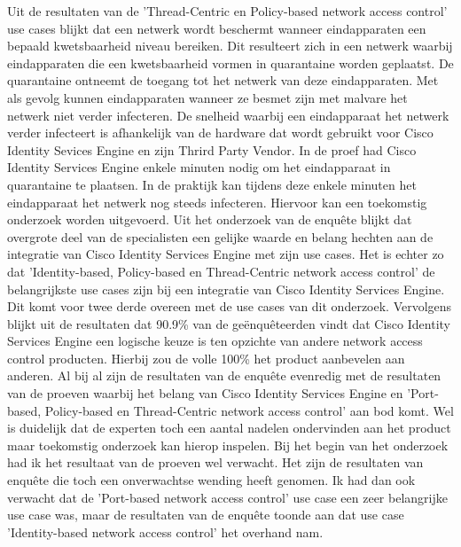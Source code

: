 Uit de resultaten van de 'Thread-Centric en Policy-based network access control' use cases blijkt dat een netwerk wordt beschermt wanneer eindapparaten een bepaald kwetsbaarheid niveau bereiken. Dit resulteert zich in een netwerk waarbij eindapparaten die een kwetsbaarheid vormen in quarantaine worden geplaatst. De quarantaine ontneemt de toegang tot het netwerk van deze eindapparaten. Met als gevolg kunnen eindapparaten wanneer ze besmet zijn met malvare het netwerk niet verder infecteren. 
\newline
\newline
De snelheid waarbij een eindapparaat het netwerk verder infecteert is afhankelijk van de hardware dat wordt gebruikt voor Cisco Identity Sevices Engine en zijn Thrird Party Vendor. In de proef had Cisco Identity Services Engine enkele minuten nodig om het eindapparaat in quarantaine te plaatsen. In de praktijk kan tijdens deze enkele minuten het eindapparaat het netwerk nog steeds infecteren. Hiervoor kan een toekomstig onderzoek worden uitgevoerd.
\newline
\newline
Uit het onderzoek van de enquête blijkt dat overgrote deel van de specialisten een gelijke waarde en belang hechten aan de integratie van Cisco Identity Services Engine met zijn use cases. Het is echter zo dat 'Identity-based, Policy-based en Thread-Centric network access control' de belangrijkste use cases zijn bij een integratie van Cisco Identity Services Engine. Dit komt voor twee derde overeen met de use cases van dit onderzoek. Vervolgens blijkt uit de resultaten dat 90.9\% van de geënquêteerden vindt dat Cisco Identity Services Engine een logische keuze is ten opzichte van andere network access control producten. Hierbij zou de volle 100\% het product aanbevelen aan anderen. Al bij al zijn de resultaten van de enquête evenredig met de resultaten van de proeven waarbij het belang van Cisco Identity Services Engine en 'Port-based, Policy-based en Thread-Centric network access control' aan bod komt. Wel is duidelijk dat de experten toch een aantal nadelen ondervinden aan het product maar toekomstig onderzoek kan hierop inspelen. 
\newline
\newline
Bij het begin van het onderzoek had ik het resultaat van de proeven wel verwacht. Het zijn de resultaten van enquête die toch een onverwachtse wending heeft genomen. Ik had dan ook verwacht dat de 'Port-based network access control' use case een zeer belangrijke use case was, maar de resultaten van de enquête toonde aan dat use case 'Identity-based network access control' het overhand nam. 
